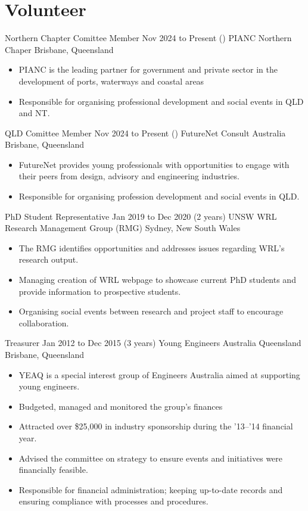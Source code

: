 
\section{Volunteer}



\entrytable%
{Northern Chapter Comittee Member}
{Nov 2024 to Present}
{()}
{PIANC Northern Chaper}
{Brisbane, Queensland}
{\begin{itemize}
\item PIANC is the leading partner for government and private sector in the development of ports, waterways and coastal areas
\item Responsible for organising professional development and social events in QLD and NT.
	\end{itemize}
}


\entrytable%
{QLD Comittee Member}
{Nov 2024 to Present}
{()}
{FutureNet Consult Australia}
{Brisbane, Queensland}
{\begin{itemize}
\item FutureNet provides young professionals with opportunities to engage with their peers from design, advisory and engineering industries.
\item Responsible for organising profession development and social events in QLD.
	\end{itemize}
}

\entrytable%
{PhD Student Representative}
{Jan 2019 to Dec 2020}
{(2 years)}
{UNSW WRL Research Management Group (RMG)}
{Sydney, New South Wales}
{\begin{itemize}
\item The RMG identifies opportunities and addresses issues regarding WRL's research output.
\item Managing creation of WRL webpage to showcase current PhD students and provide information to prospective students.
\item Organising social events between research and project staff to encourage collaboration.
	\end{itemize}
}

\entrytable%
{Treasurer}
{Jan 2012 to Dec 2015}
{(3 years)}
{Young Engineers Australia Queensland}
{Brisbane, Queensland}
{\begin{itemize}
\item YEAQ is a special interest group of Engineers Australia aimed at supporting young engineers.
\item Budgeted, managed and monitored the group's finances
\item Attracted over \$25,000 in industry sponsorship during the '13--'14 financial year.
\item Advised the committee on strategy to ensure events and initiatives were financially feasible.
\item Responsible for financial administration; keeping up-to-date records and ensuring compliance with processes and procedures.
	\end{itemize}
}




